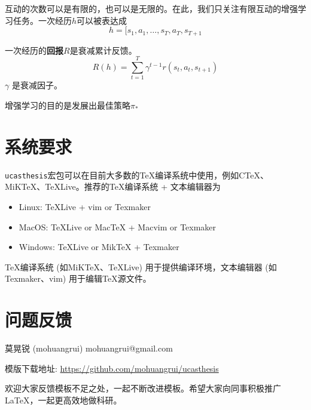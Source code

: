 互动的次数可以是有限的，也可以是无限的。在此，我们只关注有限互动的增强学习任务。一次经历$h$可以被表达成
$$ h = [s_1,a_1,\dots,s_T,a_T,s_{T+1} $$

一次经历的\textbf{回报}$R$是衰减累计反馈。
$$R(h) = \sum_{t=1}^T\gamma^{t-1}r(s_t,a_t,s_{t+1})$$
$\gamma$ 是衰减因子。

增强学习的目的是发展出最佳策略$\pi_*$



\section{系统要求}

\texttt{ucasthesis}宏包可以在目前大多数的\TeX{}编译系统中使用，例如C\TeX{}、MiK\TeX{}、\TeX{}Live。推荐的\TeX{}编译系统 + 文本编辑器为
\begin{itemize}
    \item Linux: \TeX{}Live + vim or Texmaker
    \item MacOS: \TeX{}Live or Mac\TeX{} + Macvim or Texmaker
    \item Windows: \TeX{}Live or Mik\TeX{}  + Texmaker
\end{itemize}
\TeX{}编译系统 (如MiK\TeX{}、\TeX{}Live) 用于提供编译环境，文本编辑器 (如Texmaker、vim) 用于编辑\TeX{}源文件。

\section{问题反馈}

\begin{center}
莫晃锐 (mohuangrui) \quad mohuangrui@gmail.com

模版下载地址: \url{https://github.com/mohuangrui/ucasthesis}
\end{center}

欢迎大家反馈模板不足之处，一起不断改进模板。希望大家向同事积极推广\LaTeX{}，一起更高效地做科研。
